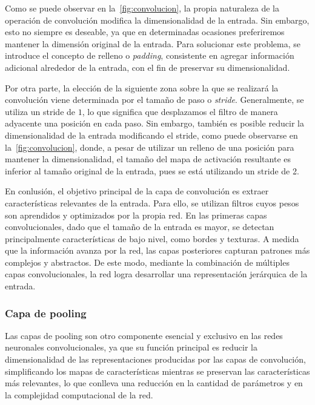 Como se puede observar en la~\autoref{fig:convolucion}, la propia naturaleza de la operación de convolución modifica la dimensionalidad de la entrada. Sin embargo, esto no siempre es deseable, ya que en determinadas ocasiones preferiremos mantener la dimensión original de la entrada. Para solucionar este problema, se introduce el concepto de relleno o \emph{padding}, consistente en agregar información adicional alrededor de la entrada, con el fin de preservar su dimensionalidad.\newline

Por otra parte, la elección de la siguiente zona sobre la que se realizará la convolución viene determinada por el tamaño de paso o \emph{stride}. Generalmente, se utiliza un stride de $1$, lo que significa que desplazamos el filtro de manera adyacente una posición en cada paso. Sin embargo, también es posible reducir la dimensionalidad de la entrada modificando el stride, como puede observarse en la~\autoref{fig:convolucion}, donde, a pesar de utilizar un relleno de una posición para mantener la dimensionalidad, el tamaño del mapa de activación resultante es inferior al tamaño original de la entrada, pues se está utilizando un stride de 2.\newline

En conlusión, el objetivo principal de la capa de convolución es extraer características relevantes de la entrada. Para ello, se utilizan filtros cuyos pesos son aprendidos y optimizados por la propia red. En las primeras capas convolucionales, dado que el tamaño de la entrada es mayor, se detectan principalmente características de bajo nivel, como bordes y texturas. A medida que la información avanza por la red, las capas posteriores capturan patrones más complejos y abstractos. De este modo, mediante la combinación de múltiples capas convolucionales, la red logra desarrollar una representación jerárquica de la entrada.\newline

\subsubsection{Capa de pooling}

Las capas de pooling son otro componente esencial y exclusivo en las redes neuronales convolucionales, ya que su función principal es reducir la dimensionalidad de las representaciones producidas por las capas de convolución, simplificando los mapas de características mientras se preservan las características más relevantes, lo que conlleva una reducción en la cantidad de parámetros y en la complejidad computacional de la red.\newline

